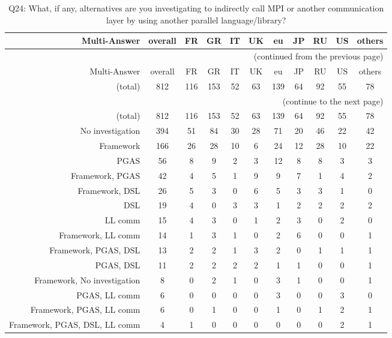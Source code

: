 \clearpage%
{\footnotesize\begin{landscape}%
\begin{longtable}[htb]{r|c|c|c|c|c|c|c|c|c|c}%
\caption{Q24: What, if any, alternatives are you investigating to indirectly call MPI or another communication layer by using another parallel language/library?}%
\label{tab:Q24-mans} \\%
\hline%
Multi-Answer & overall & FR & GR & IT & UK & eu & JP & RU & US & others \\
 \hline%
\endfirsthead%
\multicolumn{11}{r}{(continued from the previous page)}\\%
\hline%
Multi-Answer & overall & FR & GR & IT & UK & eu & JP & RU & US & others \\
 \hline%
\endhead%
\hline%
(total) & 812 & 116 & 153 & 52 & 63 & 139 & 64 & 92 & 55 & 78 \\%
\hline%
\multicolumn{11}{r}{(continue to the next page)}\\%
\endfoot%
\hline%
(total) & 812 & 116 & 153 & 52 & 63 & 139 & 64 & 92 & 55 & 78 \\%
\hline%
\endlastfoot%
\hline%
{No investigation} & 394 & 51 & 84 & 30 & 28 & 71 & 20 & 46 & 22 & 42 \\%
{Framework} & 166 & 26 & 28 & 10 & 6 & 24 & 12 & 28 & 10 & 22 \\%
{PGAS} & 56 & 8 & 9 & 2 & 3 & 12 & 8 & 8 & 3 & 3 \\%
{Framework, PGAS} & 42 & 4 & 5 & 1 & 9 & 9 & 7 & 1 & 4 & 2 \\%
{Framework, DSL} & 26 & 5 & 3 & 0 & 6 & 5 & 3 & 3 & 1 & 0 \\%
{DSL} & 19 & 4 & 0 & 3 & 3 & 1 & 2 & 2 & 2 & 2 \\%
{LL comm} & 15 & 4 & 3 & 0 & 1 & 2 & 3 & 0 & 2 & 0 \\%
{Framework, LL comm} & 14 & 1 & 3 & 1 & 0 & 2 & 6 & 0 & 0 & 1 \\%
{Framework, PGAS, DSL} & 13 & 2 & 2 & 1 & 3 & 2 & 0 & 1 & 1 & 1 \\%
{PGAS, DSL} & 11 & 2 & 2 & 2 & 2 & 1 & 1 & 0 & 0 & 1 \\%
{Framework, No investigation} & 8 & 0 & 2 & 1 & 0 & 3 & 1 & 0 & 0 & 1 \\%
{PGAS, LL comm} & 6 & 0 & 0 & 0 & 0 & 3 & 0 & 0 & 3 & 0 \\%
{Framework, PGAS, LL comm} & 6 & 0 & 1 & 0 & 0 & 1 & 0 & 1 & 2 & 1 \\%
{Framework, PGAS, DSL, LL comm} & 4 & 1 & 0 & 0 & 0 & 0 & 0 & 0 & 2 & 1 \\%

\end{longtable}
\end{landscape}}

